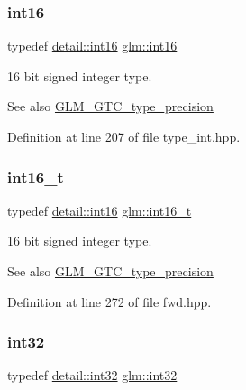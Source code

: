 \subsubsection{\texorpdfstring{int16}{int16}}
{\footnotesize\ttfamily typedef \mbox{\hyperlink{namespaceglm_1_1detail_a375938874ca4f0a0982ec6373b56117b}{detail\+::int16}} \mbox{\hyperlink{group__gtc__type__precision_ga2945a61d12771f8954994fcddf02b021}{glm\+::int16}}}

16 bit signed integer type. \begin{DoxySeeAlso}{See also}
\mbox{\hyperlink{group__gtc__type__precision}{G\+L\+M\+\_\+\+G\+T\+C\+\_\+type\+\_\+precision}} 
\end{DoxySeeAlso}


Definition at line 207 of file type\+\_\+int.\+hpp.

\mbox{\label{group__gtc__type__precision_gaf89ee61e0d34aa4a462104b7ae7f2da6}} 
\subsubsection{\texorpdfstring{int16\_t}{int16\_t}}
{\footnotesize\ttfamily typedef \mbox{\hyperlink{namespaceglm_1_1detail_a375938874ca4f0a0982ec6373b56117b}{detail\+::int16}} \mbox{\hyperlink{group__gtc__type__precision_gaf89ee61e0d34aa4a462104b7ae7f2da6}{glm\+::int16\+\_\+t}}}

16 bit signed integer type. \begin{DoxySeeAlso}{See also}
\mbox{\hyperlink{group__gtc__type__precision}{G\+L\+M\+\_\+\+G\+T\+C\+\_\+type\+\_\+precision}} 
\end{DoxySeeAlso}


Definition at line 272 of file fwd.\+hpp.

\mbox{\label{group__gtc__type__precision_ga632d8b25f6b61659f39ea4321fab92a4}} 
\subsubsection{\texorpdfstring{int32}{int32}}
{\footnotesize\ttfamily typedef \mbox{\hyperlink{namespaceglm_1_1detail_a9f85b4efeca416cdcec2fd08939a2e17}{detail\+::int32}} \mbox{\hyperlink{group__gtc__type__precision_ga632d8b25f6b61659f39ea4321fab92a4}{glm\+::int32}}}

